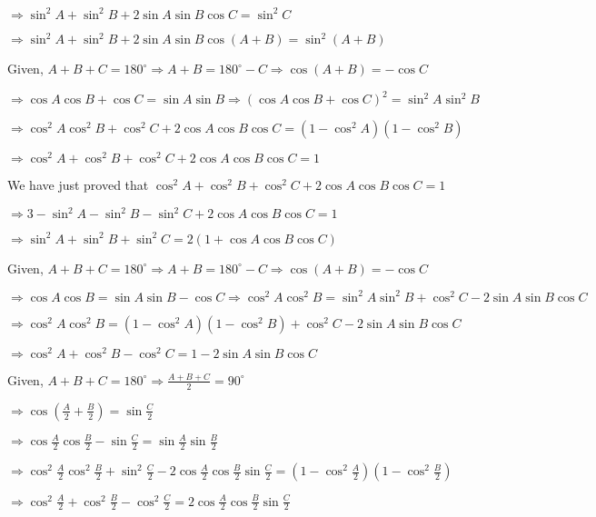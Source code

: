   $\Rightarrow \sin^2A + \sin^2B + 2\sin A\sin B\cos C = \sin^2C$

  $\Rightarrow \sin^2A + \sin^2B + 2\sin A\sin B\cos(A + B) = \sin^2(A + B)$

\item Given, $A + B + C = 180^\circ \Rightarrow A + B = 180^\circ - C \Rightarrow \cos(A + B) = -\cos C$

  $\Rightarrow \cos A\cos B + \cos C = \sin A\sin B \Rightarrow (\cos A\cos B + \cos C)^2 = \sin^2A\sin^2B$

  $\Rightarrow \cos^2A\cos^2B + \cos^2C + 2\cos A\cos B\cos C = (1 - \cos^2A)(1 - \cos^2B)$

  $\Rightarrow \cos^2A + \cos^2B + \cos^2C + 2\cos A\cos B\cos C = 1$

\item We have just proved that $\cos^2A + \cos^2B + \cos^2C + 2\cos A\cos B\cos C = 1$

  $\Rightarrow 3 - \sin^2A - \sin^2B - \sin^2C + 2\cos A\cos B\cos C = 1$

  $\Rightarrow \sin^2A + \sin^2B + \sin^2C = 2(1 + \cos A\cos B\cos C)$

\item Given, $A + B + C = 180^\circ \Rightarrow A + B = 180^\circ - C \Rightarrow \cos(A + B) = -\cos C$

  $\Rightarrow \cos A\cos B = \sin A\sin B - \cos C \Rightarrow \cos^2A\cos^2B = \sin^2A\sin^2B + \cos^2C - 2\sin A\sin
  B\cos C$

  $\Rightarrow \cos^2A\cos^2B = (1 - \cos^2A)(1 - \cos^2B) + \cos^2C - 2\sin A\sin B\cos C$

  $\Rightarrow \cos^2A + \cos^2B - \cos^2C = 1 - 2\sin A\sin B\cos C$

\item Given, $A + B + C = 180^\circ \Rightarrow \frac{A + B + C}{2} = 90^\circ$

  $\Rightarrow \cos\left(\frac{A}{2} + \frac{B}{2}\right) = \sin\frac{C}{2}$

  $\Rightarrow \cos\frac{A}{2}\cos\frac{B}{2} - \sin\frac{C}{2} = \sin\frac{A}{2}\sin\frac{B}{2}$

  $\Rightarrow \cos^2\frac{A}{2}\cos^2\frac{B}{2} + \sin^2\frac{C}{2} - 2\cos\frac{A}{2}\cos\frac{B}{2}\sin\frac{C}{2} =
  \left(1 - \cos^2\frac{A}{2}\right)\left(1 - \cos^2\frac{B}{2}\right)$

  $\Rightarrow \cos^2\frac{A}{2} + \cos^2\frac{B}{2} - \cos^2\frac{C}{2} = 2\cos\frac{A}{2}\cos\frac{B}{2}\sin\frac{C}{2}$

